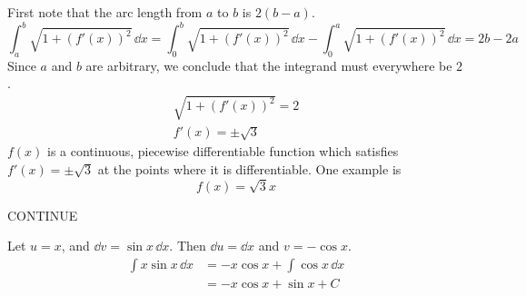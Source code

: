 \begin{Solution}
  \label{solution arclength 0 x 2x}
  First note that the arc length from $a$ to $b$ is $2 (b - a)$.
  \[
  \int_a^b \sqrt{1 + (f'(x))^2} \,\dd x
  = \int_0^b \sqrt{1 + (f'(x))^2} \,\dd x - \int_0^a \sqrt{1 + (f'(x))^2} \,\dd x
  = 2 b - 2 a
  \]
  Since $a$ and $b$ are arbitrary, we conclude that the integrand 
  must everywhere be $2$.
  \begin{gather*}
    \sqrt{1 + (f'(x))^2} = 2
    \\
    f'(x) = \pm \sqrt{3}
  \end{gather*}
  $f(x)$ is a continuous, piecewise differentiable function which satisfies
  $f'(x) = \pm \sqrt{3}$ at the points where it is differentiable.  One 
  example is
  \[
  \boxed{
    f(x) = \sqrt{3} x
    }
  \]
\end{Solution}










\begin{Solution}
  \label{solution bounded -1 1 length}
  CONTINUE
\end{Solution}








\begin{Solution}
  \label{solution int x sin x}
  Let $u=x$, and $\dd v = \sin x \,\dd x$.  Then $\dd u = \dd x$ and 
  $v = - \cos x$.
  \begin{align*}
    \int x \sin x \,\dd x
    &= -x \cos x + \int \cos x \,\dd x \\
    &= -x \cos x + \sin x + C
  \end{align*}
\end{Solution}




